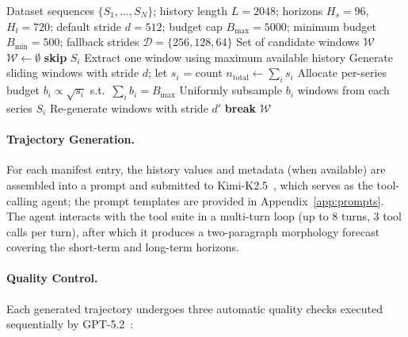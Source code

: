 \documentclass[11pt]{article}
\begin{document}
\begin{algorithm}[htbp]
\caption{Sample Windowing Strategy}
\label{alg:windowing}
\begin{algorithmic}[1]
\REQUIRE Dataset sequences $\{S_1, \ldots, S_N\}$; history length $L=2048$; horizons $H_s=96$, $H_l=720$; default stride $d=512$; budget cap $B_{\max}=5000$; minimum budget $B_{\min}=500$; fallback strides $\mathcal{D}=\{256, 128, 64\}$
\ENSURE Set of candidate windows $\mathcal{W}$
\STATE $\mathcal{W} \leftarrow \emptyset$
        \STATE \textbf{skip} $S_i$ 
        \STATE Extract one window using maximum available history 
    \ELSE
        \STATE Generate sliding windows with stride $d$; let $s_i$ = count
    \ENDIF
\ENDFOR
\STATE $n_{\text{total}} \leftarrow \sum_i s_i$
    \STATE Allocate per-series budget $b_i \propto \sqrt{s_i}$ s.t.\ $\sum_i b_i = B_{\max}$
    \STATE Uniformly subsample $b_i$ windows from each series $S_i$
        \STATE Re-generate windows with stride $d'$
            \STATE \textbf{break}
        \ENDIF
    \ENDFOR
\ENDIF
\RETURN $\mathcal{W}$
\end{algorithmic}
\end{algorithm}

\paragraph{Trajectory Generation.}
For each manifest entry, the history values and metadata (when available) are assembled into a prompt and submitted to Kimi-K2.5~\citep{team2026kimi}, which serves as the tool-calling agent; the prompt templates are provided in Appendix~\ref{app:prompts}.
The agent interacts with the tool suite in a multi-turn loop (up to 8 turns, 3 tool calls per turn), after which it produces a two-paragraph morphology forecast covering the short-term and long-term horizons.

\paragraph{Quality Control.}
Each generated trajectory undergoes three automatic quality checks executed sequentially by GPT-5.2~\citep{singh2025openai}:
\end{document}
